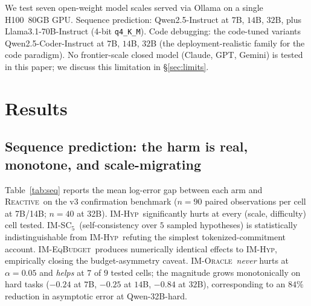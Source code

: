 \documentclass{article}
\newcommand{\reactive}{\textsc{Reactive}}
\newcommand{\imhyp}{\textsc{IM-Hyp}}
\newcommand{\imorc}{\textsc{IM-Oracle}}
\newcommand{\imsc}{\textsc{IM-SC$_5$}}
\newcommand{\imeqb}{\textsc{IM-EqBudget}}
\begin{document}
We test seven open-weight model scales served via Ollama on a
single H100~80GB GPU.  Sequence prediction:  Qwen2.5-Instruct at
$7$B, $14$B, $32$B, plus Llama3.1-70B-Instruct (4-bit
\texttt{q4\_K\_M}).  Code debugging:  the code-tuned variants
Qwen2.5-Coder-Instruct at $7$B, $14$B, $32$B (the
deployment-realistic family for the code paradigm).  No
frontier-scale closed model (Claude, GPT, Gemini) is tested in
this paper; we discuss this limitation in
\S\ref{sec:limits}.

\section{Results}
\label{sec:results}

\subsection{Sequence prediction:  the harm is real, monotone, and
scale-migrating}

Table~\ref{tab:seq} reports the mean log-error gap between each
arm and \reactive\ on the v3 confirmation benchmark
($n = 90$ paired observations per cell at 7B/14B; $n = 40$ at
32B).  \imhyp\ significantly hurts at every (scale, difficulty)
cell tested.  \imsc\ (self-consistency over $5$ sampled
hypotheses) is statistically indistinguishable from \imhyp\,
refuting the simplest tokenized-commitment account.
\imeqb\ produces numerically identical effects to \imhyp,
empirically closing the budget-asymmetry caveat.  \imorc\
\emph{never} hurts at $\alpha = 0.05$ and \emph{helps} at $7$ of
$9$ tested cells; the magnitude grows monotonically on hard
tasks ($-0.24$ at $7$B, $-0.25$ at $14$B, $\mathbf{-0.84}$ at
$32$B), corresponding to an $84\%$ reduction in asymptotic
error at Qwen-32B-hard.
\end{document}
